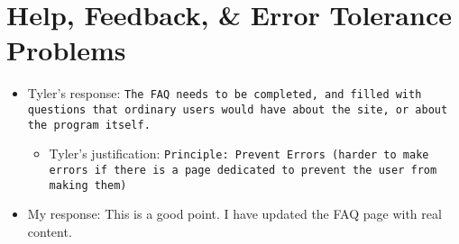 \documentclass{article}
\begin{document}
\section{Help, Feedback, \& Error Tolerance Problems}
\begin{itemize}
	\item Tyler's response: \texttt{The FAQ needs to be completed, and filled with questions that ordinary users would have about the site, or about the program itself.
}
	\begin{itemize}
		\item Tyler's justification: \texttt{Principle: Prevent Errors (harder to make errors if there is a page dedicated to prevent the user from making them)
}
	\end{itemize}
	\item My response: This is a good point.  I have updated the FAQ page with real content.
\end{itemize}
\end{document}
